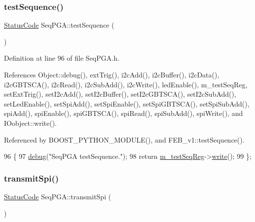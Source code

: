 \subsubsection{\texorpdfstring{test\+Sequence()}{testSequence()}}
{\footnotesize\ttfamily \hyperlink{classStatusCode}{Status\+Code} Seq\+P\+G\+A\+::test\+Sequence (\begin{DoxyParamCaption}{ }\end{DoxyParamCaption})\hspace{0.3cm}{\ttfamily [inline]}}



Definition at line 96 of file Seq\+P\+G\+A.\+h.



References Object\+::debug(), ext\+Trig(), i2c\+Add(), i2c\+Buffer(), i2c\+Data(), i2c\+G\+B\+T\+S\+C\+A(), i2c\+Read(), i2c\+Sub\+Add(), i2c\+Write(), led\+Enable(), m\+\_\+test\+Seq\+Reg, set\+Ext\+Trig(), set\+I2c\+Add(), set\+I2c\+Buffer(), set\+I2c\+G\+B\+T\+S\+C\+A(), set\+I2c\+Sub\+Add(), set\+Led\+Enable(), set\+Spi\+Add(), set\+Spi\+Enable(), set\+Spi\+G\+B\+T\+S\+C\+A(), set\+Spi\+Sub\+Add(), spi\+Add(), spi\+Enable(), spi\+G\+B\+T\+S\+C\+A(), spi\+Read(), spi\+Sub\+Add(), spi\+Write(), and I\+Oobject\+::write().



Referenced by B\+O\+O\+S\+T\+\_\+\+P\+Y\+T\+H\+O\+N\+\_\+\+M\+O\+D\+U\+L\+E(), and F\+E\+B\+\_\+v1\+::test\+Sequence().


\begin{DoxyCode}
96                             \{
97     \hyperlink{classObject_aac010553f022165573714b7014a15f0d}{debug}(\textcolor{stringliteral}{"SeqPGA testSequence."});
98     \textcolor{keywordflow}{return} \hyperlink{classSeqPGA_a7478537516c951a4d08f23b0789ed6d9}{m\_testSeqReg}->\hyperlink{classIOobject_a9f6984bc9f0fadcf800f1be2523ac744}{write}();
99   \};
\end{DoxyCode}
\mbox{\label{classSeqPGA_a579b4ab222e1c4778640948fbf2a8805}} 
\subsubsection{\texorpdfstring{transmit\+Spi()}{transmitSpi()}}
{\footnotesize\ttfamily \hyperlink{classStatusCode}{Status\+Code} Seq\+P\+G\+A\+::transmit\+Spi (\begin{DoxyParamCaption}{ }\end{DoxyParamCaption})\hspace{0.3cm}{\ttfamily [inline]}}



